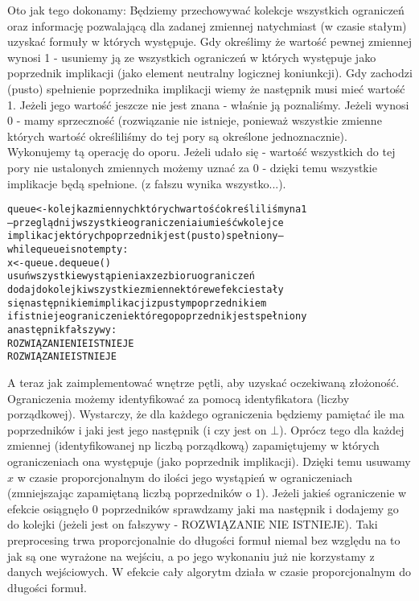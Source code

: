 \documentclass[a4paper,12pt]{article}
\begin{document}
Oto jak tego dokonamy: Będziemy przechowywać kolekcje wszystkich ograniczeń oraz informację pozwalającą dla zadanej zmiennej natychmiast (w czasie stałym) uzyskać formuły w których występuje. Gdy określimy że wartość pewnej zmiennej wynosi 1 - usuniemy ją ze wszystkich ograniczeń w których występuje jako poprzednik implikacji (jako element neutralny logicznej koniunkcji). Gdy zachodzi (pusto) spełnienie poprzednika implikacji wiemy że następnik musi mieć wartość 1. Jeżeli jego wartość jeszcze nie jest znana - właśnie ją poznaliśmy. Jeżeli wynosi 0 - mamy sprzeczność (rozwiązanie nie istnieje, ponieważ wszystkie zmienne których wartość określiliśmy do tej pory są określone jednoznacznie). Wykonujemy tą operację do oporu. Jeżeli udało się - wartość wszystkich do tej pory nie ustalonych zmiennych możemy uznać za 0 - dzięki temu wszystkie implikacje będą spełnione. (z fałszu wynika wszystko...).
\begin{alltt}
 queue <- kolejka zmiennych których wartość określiliśmy na 1
 --przeglądnij wszystkie ograniczenia i umieść w kolejce
 implikacje których poprzednik jest (pusto) spełniony--
 while queue is not empty:
    x <- queue.dequeue()
    usuń wszystkie wystąpienia x ze zbioru ograniczeń
    dodaj do kolejki wszystkie zmienne które w efekcie stały
       się następnikiem implikacji z pustym poprzednikiem
    if istnieje ograniczenie którego poprzednik jest spełniony
       a następnik fałszywy:
       ROZWIĄZANIE NIE ISTNIEJE
 ROZWIĄZANIE ISTNIEJE
\end{alltt}
A teraz jak zaimplementować wnętrze pętli, aby uzyskać oczekiwaną złożoność. Ograniczenia możemy identyfikować za pomocą identyfikatora (liczby porządkowej). Wystarczy, że dla każdego ograniczenia będziemy pamiętać ile ma poprzedników i jaki jest jego następnik (i czy jest on $\bot$). Oprócz tego dla każdej zmiennej (identyfikowanej np liczbą porządkową) zapamiętujemy w których ograniczeniach ona występuje (jako poprzednik implikacji). Dzięki temu usuwamy $x$ w czasie proporcjonalnym do ilości jego wystąpień w ograniczeniach (zmniejszając zapamiętaną liczbą poprzedników o 1). Jeżeli jakieś ograniczenie w efekcie osiągnęło 0 poprzedników sprawdzamy jaki ma następnik i dodajemy go do kolejki (jeżeli jest on fałszywy - ROZWIĄZANIE NIE ISTNIEJE). Taki preprocesing trwa proporcjonalnie do długości formuł niemal bez względu na to jak są one wyrażone na wejściu, a po jego wykonaniu już nie korzystamy z danych wejściowych. W efekcie cały algorytm działa w czasie proporcjonalnym do długości formuł.
\end{document}
